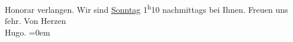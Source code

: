 \begin{ledgroupsized}[t]{13cm}
               Honorar verlangen.\pend
           \pstart
           Wir sind \uline{Sonntag}{ }1\textsuperscript{h}10 nachmittags bei Ihnen. Freuen uns
               ſehr.\pend
           \pstart
           Von Herzen{\\[\baselineskip]}\spacefill\mbox{Hugo.}\pend
           \leftskip=0em{}\endnumbering{}\end{ledgroupsized}  \newcommand{\dateiname}{L01690}\newcommand{\titel}{Hugo von Hofmannsthal an Arthur Schnitzler, 11. 7. 1907}\newcommand{\editorInnen}{Martin Anton Müller und Gerd-Hermann Susen}
      
